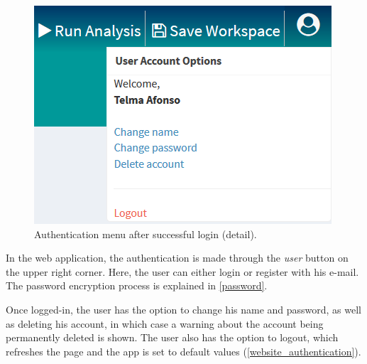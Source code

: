 \begin{figure}
	\centering
	\includegraphics[width=\linewidth]{Imagens/webspecmine_authentication}
	\caption{Authentication menu after successful login (detail).}\label{website_authentication}
\end{figure}

In the web application, the authentication is made through the \textit{user} button on the upper right corner. Here, the user can either login or register with his e-mail. The password encryption process is explained in \autoref{password}.

Once logged-in, the user has the option to change his name and password, as well as deleting his account, in which case a warning about the account being permanently deleted is shown. The user also has the option to logout, which refreshes the page and the app is set to default values (\autoref{website_authentication}).


%	



